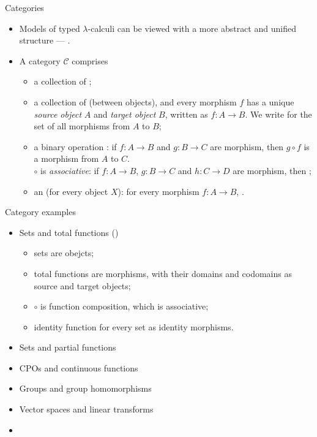 \documentclass[paper=screen,mode=present,style=zysimple]{powerdot}
\newcommand{\cate}{\mathcal C}
\begin{document}
\begin{slide}{Categories}
\begin{itemize}
\item Models of typed $\lambda$-calculi can be viewed with a more abstract and unified structure --- .
\item A category $\cate$ comprises 
\begin{itemize}\small
\item a collection of ;
\item a collection of  (between objects), and every morphism $f$ has 
  a unique {\em source object} $A$ and {\em target object} $B$, written as $f: A \to B$. 
  We write \emblue{$\cate[A, B]$} for the set of all morphisms from $A$ to $B$;
\item a binary operation : if $f: A \to B$ and  $g: B \to C$ are morphism, 
  then $g \circ f$ is a morphism from $A$ to $C$. \\ 
  $\circ$ is {\em associative}: if $f: A \to B$, $g: B \to C$ and $h: C \to D$ are morphism, 
  then ;
\item an  (for every object $X$): for every morphism $f: A \to B$, 
  .
\end{itemize}
\end{itemize}
\end{slide}

\begin{slide}{Category examples}
\begin{itemize}
\item Sets and total functions () \vspace*{-0.5em}
\begin{itemize}\small
\item sets are obejcts;
\item total functions are morphisms, with their domains and codomains as source and target objects; 
\item $\circ$ is function composition, which is associative;
\item identity function for every set as identity morphisms. 
\vspace*{-1em}
\end{itemize}
\item Sets and partial functions
\item CPOs and continuous functions
\item Groups and group homomorphisms
\item Vector spaces and linear transforms
\item {}
\end{itemize}
\end{slide}
\end{document}
